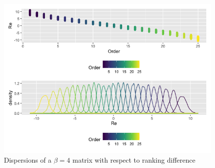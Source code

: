 \begin{figure}[h]
	   
	       \centering
	    \includegraphics[scale = 0.6]{chapters/graphics/c2_order_sign}
	     \caption{Dispersions of a $\beta = 4$ matrix with respect to ranking difference}
	 \label{subd}
	\end{figure}


